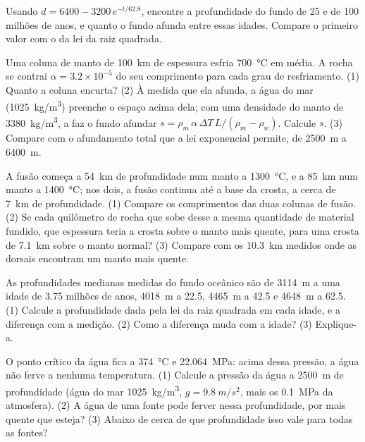 \begin{exercise}[$\star\star$]\label{exo:g11:ocean-ridges:11}
Usando $d = 6400 - 3200\,e^{-t/62.8}$, encontre a profundidade do fundo de
25 e de 100 milhões de anos, e quanto o fundo afunda entre essas idades.
Compare o primeiro valor com o da lei da raiz quadrada.
\end{exercise}

\begin{exercise}[$\star\star\star$]\label{exo:g11:ocean-ridges:12}
Uma coluna de manto de \qty{100}{km} de espessura esfria \qty{700}{\celsius}
em média. A rocha se contrai $\alpha = 3.2 \times 10^{-5}$ do seu
comprimento para cada grau de resfriamento. (1) Quanto a coluna encurta?
(2) À medida que ela afunda, a água do mar (\qty{1025}{kg/m^3}) preenche o
espaço acima dela; com uma densidade do manto de \qty{3380}{kg/m^3}, a
 faz o fundo afundar
$s = \rho_m\,\alpha\,\Delta T\,L/(\rho_m - \rho_w)$. Calcule $s$. (3) Compare
com o afundamento total que a lei exponencial permite, de \qty{2500}{m} a
\qty{6400}{m}.
\end{exercise}

\begin{exercise}[$\star\star\star$]\label{exo:g11:ocean-ridges:13}
A fusão começa a \qty{54}{km} de profundidade num manto a
\qty{1300}{\celsius}, e a \qty{85}{km} num manto a \qty{1400}{\celsius}; nos
dois, a fusão continua até a base da crosta, a cerca de \qty{7}{km} de
profundidade. (1) Compare os comprimentos das duas colunas de fusão. (2) Se
cada quilômetro de rocha que sobe desse a mesma quantidade de material
fundido, que espessura teria a crosta sobre o manto mais quente, para uma
crosta de \qty{7.1}{km} sobre o manto normal? (3) Compare com os
\qty{10.3}{km} medidos onde as dorsais encontram um manto mais quente.
\end{exercise}

\begin{exercise}[$\star\star\star$]\label{exo:g11:ocean-ridges:14}
As profundidades medianas medidas do fundo oceânico são de \qty{3114}{m} a
uma idade de \num{3.75} milhões de anos, \qty{4018}{m} a \num{22.5},
\qty{4465}{m} a \num{42.5} e \qty{4648}{m} a \num{62.5}. (1) Calcule a
profundidade dada pela lei da raiz quadrada em cada idade, e a diferença com
a medição. (2) Como a diferença muda com a idade? (3) Explique-a.
\end{exercise}

\begin{exercise}[$\star\star\star$]\label{exo:g11:ocean-ridges:15}
O ponto crítico da água fica a \qty{374}{\celsius} e \qty{22.064}{MPa}:
acima dessa pressão, a água não ferve a nenhuma temperatura. (1) Calcule a
pressão da água a \qty{2500}{m} de profundidade (água do mar
\qty{1025}{kg/m^3}, $g = \qty{9.8}{m/s^2}$, mais os \qty{0.1}{MPa} da
atmosfera). (2) A água de uma fonte pode ferver nessa profundidade, por mais
quente que esteja? (3) Abaixo de cerca de que profundidade isso vale para
todas as fontes?
\end{exercise}

